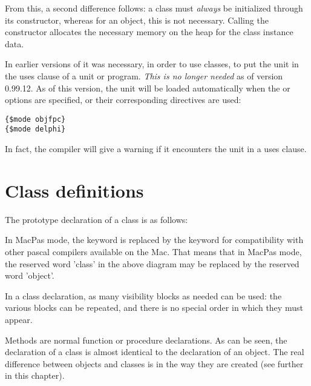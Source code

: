 From this, a second difference follows: a class must {\em always} be initialized
through its constructor, whereas for an object, this is not necessary.
Calling the constructor allocates the necessary memory on the heap for the
class instance data. 

\begin{remark}
In earlier versions of \fpc it was necessary, in order to use classes,
to put the  unit in the uses clause of a unit or program.
{\em This is no longer needed} as of version 0.99.12. As of this version,
the unit will be loaded automatically when the  or
  options are specified, or their corresponding directives are
used:
\begin{verbatim}
{$mode objfpc}
{$mode delphi}
\end{verbatim}
In fact, the compiler will give a warning if it encounters the
 unit in a uses clause.
\end{remark}

\section{Class definitions}
The prototype declaration of a class is as follows:


\begin{remark}
In MacPas mode, the  keyword is replaced by the 
keyword for compatibility with other pascal compilers available on the Mac. 
That means that in MacPas mode, the reserved word 'class' in the above
diagram may be replaced by the reserved word 'object'.
\end{remark}

In a class declaration, as many visibility blocks as needed can be used: 
the various blocks can be repeated, and there is no special order in 
which they must appear.

Methods are normal function or procedure declarations.
As can be seen, the declaration of a class is almost identical to the
declaration of an object. The real difference between objects and classes
is in the way they are created (see further in this chapter).

